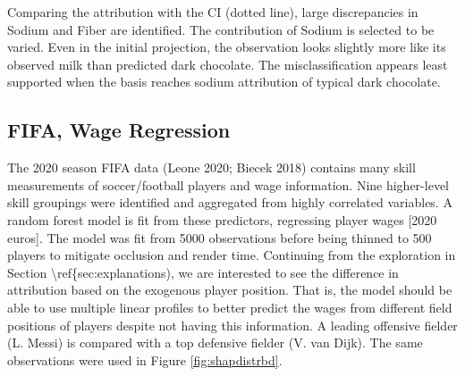 \documentclass[
]{article}
\begin{document}
Comparing the attribution with the CI (dotted line), large discrepancies in Sodium and Fiber are identified. The contribution of Sodium is selected to be varied. Even in the initial projection, the observation looks slightly more like its observed milk than predicted dark chocolate. The misclassification appears least supported when the basis reaches sodium attribution of typical dark chocolate.

\hypertarget{fifa-wage-regression}{%
\subsection{FIFA, Wage Regression}\label{fifa-wage-regression}}

The 2020 season FIFA data (Leone 2020; Biecek 2018) contains many skill measurements of soccer/football players and wage information. Nine higher-level skill groupings were identified and aggregated from highly correlated variables. A random forest model is fit from these predictors, regressing player wages {[}2020 euros{]}. The model was fit from 5000 observations before being thinned to 500 players to mitigate occlusion and render time. Continuing from the exploration in Section \textbackslash ref\{sec:explanations), we are interested to see the difference in attribution based on the exogenous player position. That is, the model should be able to use multiple linear profiles to better predict the wages from different field positions of players despite not having this information. A leading offensive fielder (L. Messi) is compared with a top defensive fielder (V. van Dijk). The same observations were used in Figure \ref{fig:shapdistrbd}.
\end{document}
